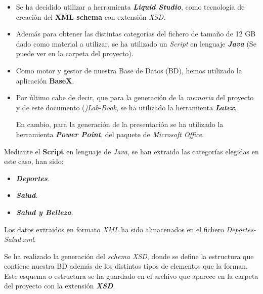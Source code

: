 \documentclass[idxtotoc,hyperref,openany]{labbook} %
\begin{document}
\begin{itemize}
	\item Se ha decidido utilizar a herramienta \textbf{\textit{Liquid Studio}}, como tecnología de creación del \textbf{XML schema} con extensión \textit{XSD}.
	
	\item  Además para obtener las distintas categorías del fichero de tamaño de 12 GB dado como material a utilizar, se ha utilizado un \textit{Script} en lenguaje \textit{\textbf{Java}} (Se puede ver en 
	la carpeta del proyecto).
	
	\item  Como motor y gestor de nuestra Base de Datos (BD), hemos utilizado la aplicación \textbf{BaseX\textit{}}.
	
	\item  Por último cabe de decir, que para la generación de la \textit{memoria} del proyecto y de este documento (\textit{)Lab-Book}, se ha utilizado la herramienta \textit{\textbf{Latex}}.
	
	En cambio, para la generación de la presentación se ha utilizado la herramienta \textit{\textbf{Power Point}}, del paquete de \textit{Microsoft Office}.
\end{itemize}


Mediante el \textbf{Script} en lenguaje de \textit{Java}, se han extraido las categorías elegidas en este caso, han sido: 

\begin{itemize}
	\item \textbf{\textit{Deportes}}.
	\item \textbf{\textit{Salud}}.
	\item \textbf{\textit{Salud y Belleza}}.
\end{itemize}

 Los datos extraidos en formato \textit{XML} ha sido almacenados en el fichero \textit{Deportes-Salud.xml}.


Se ha realizado la generación del \textit{schema XSD}, donde se define la estructura que contiene nuestra BD además de los distintos tipos de elementos que la forman. Este esquema o estructura se ha guardado en el archivo que aparece en la carpeta del proyecto con la extensión \textit{\textbf{XSD}}.
\end{document}
